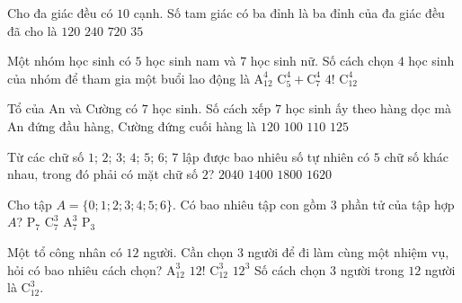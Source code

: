 \begin{ex}%
	Cho đa giác đều có $10$ cạnh. Số tam giác có ba đỉnh là ba đỉnh của đa giác đều đã cho là
	\choice
	{\True $120$}
	{$240$}
	{$720$}
	{$35$}
\end{ex}

\begin{ex}%
	Một nhóm học sinh có $ 5 $ học sinh nam và $ 7 $ học sinh nữ. Số cách chọn $ 4 $ học sinh của nhóm để tham gia một buổi lao động là
	\choice
	{$ \mathrm{A}_{12}^4 $}
	{$ \mathrm{C}_5^4+\mathrm{C}_7^4 $}
	{$ 4! $}
	{\True $ \mathrm{C}_{12}^4 $}
\end{ex}

\begin{ex}%
	Tổ của An và Cường có $7$ học sinh. Số cách xếp $7$ học sinh ấy theo hàng dọc mà An đứng đầu hàng, Cường đứng cuối hàng là
	\choice
	{\True $120$}
	{$100$}
	{$110$}
	{$125$}
\end{ex}


\begin{ex}%
	Từ các chữ số $1$; $2$; $3$; $4$; $5$; $6$; $7$ lập được bao nhiêu số tự nhiên có $5$ chữ số khác nhau, trong đó phải có mặt chữ số $2$?
	\choice
	{$2040$}
	{$1400$}
	{\True $1800$}
	{$1620$}
\end{ex}
\begin{ex}%
	Cho tập $ A =\{0;1;2;3;4;5;6\}$. Có bao nhiêu tập con gồm $ 3 $ phần tử của tập hợp $ A $?
	\choice
	{$ \mathrm{P}_7 $}
	{\True $ \mathrm{C}^3_7 $}
	{$ \mathrm{A}^3_7 $}
	{$ \mathrm{P}_3 $}
\end{ex}
\begin{ex}%
	Một tổ công nhân có $12$ người. Cần chọn $3$ người để đi làm cùng một nhiệm vụ, hỏi có bao nhiêu cách chọn?
	\choice
	{$\mathrm{A}_{12}^3$}
	{$12!$}
	{\True $\mathrm{C}_{12}^3$}
	{$12^3$}
	\loigiai
	{
		Số cách chọn $3$ người trong $12$ người là $\mathrm{C}_{12}^3$.
	}
\end{ex}

